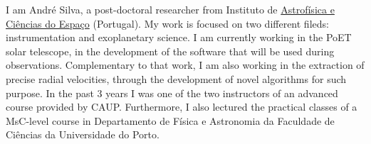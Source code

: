 \documentclass[11pt,a4paper,sans]{moderncv}
\newcommand{\langen}[1]{%
  \ifen\selectlanguage{english}#1\fi}
\begin{document}
\makecvtitle


\langen{
I am André Silva, a post-doctoral researcher from Instituto de \href{https://www.iastro.pt/}{Astrofísica e Ciências do Espaço} (Portugal). My work is focused on two different fileds: instrumentation and exoplanetary science. I am currently working in the PoET solar telescope, in the development of the software that will be used during observations. Complementary to that work, I am also working in the extraction of precise radial velocities, through the development of novel algorithms for such purpose. In the past 3 years I was one of the two instructors of an advanced course provided by CAUP. Furthermore, I also lectured the practical classes of a MsC-level course in Departamento de Física e Astronomia da Faculdade de Ciências da Universidade do Porto.
}













 
% 
\end{document}
